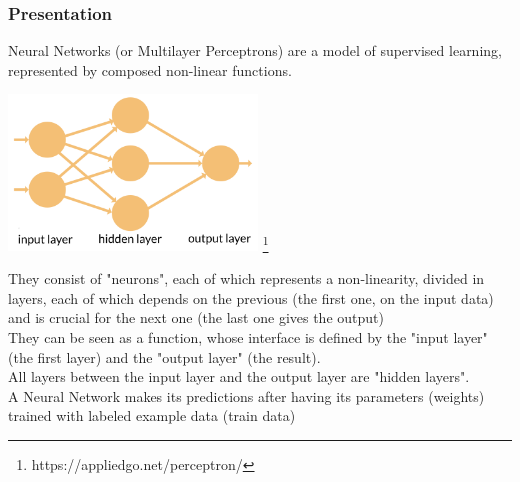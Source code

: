 \subsubsection{Presentation}
Neural Networks (or Multilayer Perceptrons) are a model of supervised learning, represented by composed non-linear functions.\\
\begin{center}
    \captionsetup{type=figure}
    \includegraphics[width=250px]{mlp.png}
    \footnote{https://appliedgo.net/perceptron/}
\end{center}
They consist of "neurons", each of which represents a non-linearity, divided in layers, each of which depends on the previous (the first one, on the input data) and is crucial for the next one (the last one gives the output)\\
They can be seen as a function, whose interface is defined by the "input layer" (the first layer) and the "output layer" (the result).\\
All layers between the input layer and the output layer are "hidden layers".\\
A Neural Network makes its predictions after having its parameters (weights) trained with labeled example data (train data)

